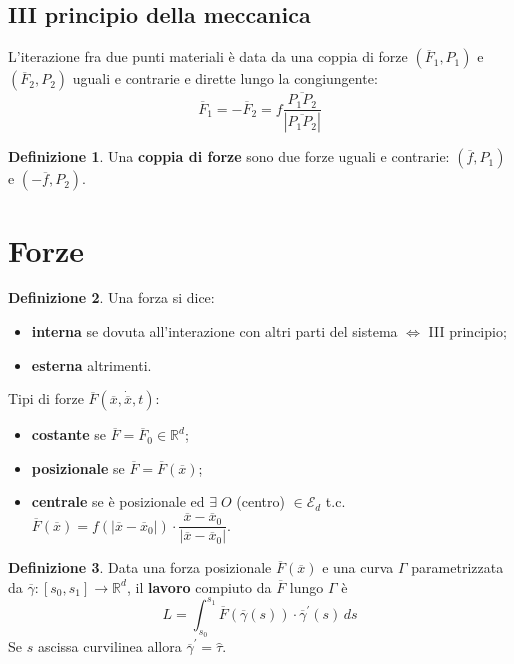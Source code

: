 \documentclass{book}
\theoremstyle{plain}
\theoremstyle{plain}
\theoremstyle{plain}
\theoremstyle{plain}
\theoremstyle{plain}
\theoremstyle{definition}
\newtheorem{defi}{Definizione}[chapter]
\theoremstyle{remark}
\theoremstyle{definition}
\begin{document}
\subsection*{III principio della meccanica}

L'iterazione fra due punti materiali è data da una coppia di forze $\left(\overline{F}_1, P_1\right)$ e $\left(\overline{F}_2, P_2\right)$ uguali e contrarie e dirette lungo la congiungente:
\begin{displaymath}
\boxed{
    \overline{F}_{1}=-\overline{F}_{2}=f \frac{\overline{P_{1}P_{2}}}{\left|\overline{P_1 P_2}\right|}
    }
\end{displaymath}

\begin{defi}
    Una \textbf{coppia di forze} sono due forze uguali e contrarie:  $\left(\overline{f}, P_1\right)$ e $\left(-\overline{f}, P_2\right)$.
\end{defi}

\section{Forze}

\begin{defi}
    Una forza si dice:
    \begin{itemize}
        \item \textbf{interna} se dovuta all'interazione con altri parti del sistema $\iff$ III principio;
        \item \textbf{esterna} altrimenti.
    \end{itemize}
\end{defi}

\noindent Tipi di forze $\overline{F}(\overline{x}, \dot{\overline{x}}, t)$:
\begin{itemize}
    \item \textbf{costante} se $\overline{F}=\overline{F}_{0} \in \mathbb{R}^{d}$;
    \item \textbf{posizionale} se $\overline{F}=\overline{F}(\overline{x})$;
    \item \textbf{centrale} se è posizionale ed $\exists \; O$ (centro) $\in \mathcal{E}_d$  t.c. $\overline{F}(\overline{x})=f\left(\left|\overline{x}-\overline{x}_{0}\right|\right) \cdot \dfrac{\overline{x}-\overline{x}_{0}}{\left|\overline{x}-\overline{x}_{0}\right|}$.
\end{itemize}

\begin{defi}
    Data una forza posizionale $\overline{F}(\overline{x})$ e una curva $\Gamma$ parametrizzata da $\overline{\gamma}:\left[s_{0}, s_{1}\right] \to \mathbb{R}^{d}$, il \textbf{lavoro} compiuto da $\overline{F}$ lungo $\Gamma$ è
    \begin{displaymath}
    \boxed{
        L=\int_{s_{0}}^{s_{1}} \overline{F}(\overline{\gamma}(s)) \cdot \overline{\gamma}^{\prime}(s)\,ds
        }
    \end{displaymath}
    Se $s$ ascissa curvilinea allora $\overline{\gamma}^{\prime}=\hat{\tau}$.
\end{defi}
\end{document}
